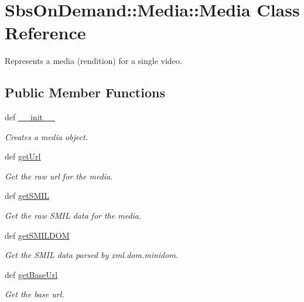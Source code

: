 \hypertarget{class_sbs_on_demand_1_1_media_1_1_media}{
\section{\-Sbs\-On\-Demand\-:\-:\-Media\-:\-:\-Media \-Class \-Reference}
\label{class_sbs_on_demand_1_1_media_1_1_media}
}


\-Represents a media (rendition) for a single video.  


\subsection*{\-Public \-Member \-Functions}
\begin{DoxyCompactItemize}
\item 
def \hyperlink{class_sbs_on_demand_1_1_media_1_1_media_aa6c4988ef361e60c94c6d1a94cc579f4}{\-\_\-\-\_\-init\-\_\-\-\_\-}
\begin{DoxyCompactList}\small\item\em \-Creates a media object. \end{DoxyCompactList}\item 
def \hyperlink{class_sbs_on_demand_1_1_media_1_1_media_acf13419a6f601341415b3f67f1843429}{get\-Url}
\begin{DoxyCompactList}\small\item\em \-Get the raw url for the media. \end{DoxyCompactList}\item 
def \hyperlink{class_sbs_on_demand_1_1_media_1_1_media_a0e65328b6f773a9a2056e4158f11c447}{get\-S\-M\-I\-L}
\begin{DoxyCompactList}\small\item\em \-Get the raw \-S\-M\-I\-L data for the media. \end{DoxyCompactList}\item 
def \hyperlink{class_sbs_on_demand_1_1_media_1_1_media_ada2af1c6c36c7a2fc6e7bf753003ffc4}{get\-S\-M\-I\-L\-D\-O\-M}
\begin{DoxyCompactList}\small\item\em \-Get the \-S\-M\-I\-L data parsed by xml.\-dom.\-minidom. \end{DoxyCompactList}\item 
def \hyperlink{class_sbs_on_demand_1_1_media_1_1_media_a5fe37abcdbd1b181d7b438beb2fa853e}{get\-Base\-Url}
\begin{DoxyCompactList}\small\item\em \-Get the base url. \end{DoxyCompactList}\item 

\end{DoxyCompactItemize}
